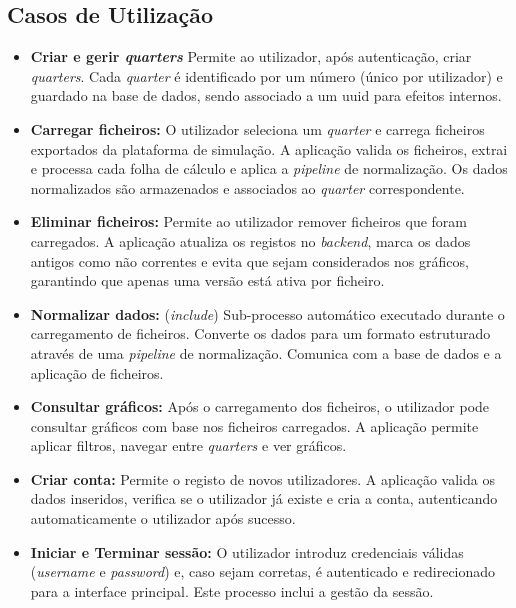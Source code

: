 \subsection{Casos de Utilização}
\begin{itemize}
    \item \textbf{Criar e gerir \textit{quarters}}
    Permite ao utilizador, após autenticação, criar \textit{quarters}. Cada \textit{quarter} é identificado por um número (único por utilizador) e guardado na base de dados, sendo associado a um \gls{uuid} para efeitos internos.

    \item \textbf{Carregar ficheiros:} O utilizador seleciona um \textit{quarter} e carrega ficheiros exportados da plataforma de simulação. A aplicação valida os ficheiros, extrai e processa cada folha de cálculo e aplica a \textit{pipeline} de normalização. Os dados normalizados são armazenados e associados ao \textit{quarter} correspondente.

    \item \textbf{Eliminar ficheiros:} Permite ao utilizador remover ficheiros que foram carregados. A aplicação atualiza os registos no \textit{backend}, marca os dados antigos como não correntes e evita que sejam considerados nos gráficos, garantindo que apenas uma versão está ativa por ficheiro.

    \item \textbf{Normalizar dados:} (\textit{include}) Sub-processo automático executado durante o carregamento de ficheiros. Converte os dados para um formato estruturado através de uma \textit{pipeline} de normalização. Comunica com a base de dados e a aplicação de ficheiros.

    \item \textbf{Consultar gráficos:} Após o carregamento dos ficheiros, o utilizador pode consultar gráficos com base nos ficheiros carregados. A aplicação permite aplicar filtros, navegar entre \textit{quarters} e ver gráficos.

    \item \textbf{Criar conta:} Permite o registo de novos utilizadores. A aplicação valida os dados inseridos, verifica se o utilizador já existe e cria a conta, autenticando automaticamente o utilizador após sucesso.

    \item \textbf{Iniciar e Terminar sessão:} O utilizador introduz credenciais válidas (\textit{username} e \textit{password}) e, caso sejam corretas, é autenticado e redirecionado para a interface principal. Este processo inclui a gestão da sessão.

\end{itemize}

